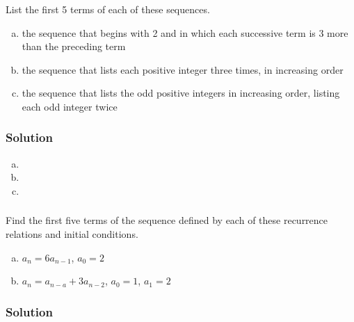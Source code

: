 \documentclass[11pt,a4paper,multicol]{article}
\newcommand{\problem}[1]{%
\setcounter{subsubsection}{#1}%
\addtocounter{subsubsection}{-1}%
\subsubsection{\hfill}%
}
\newenvironment{subproblem}
	{\begin{enumerate}[a)]}
	{\end{enumerate}}
\newcommand{\skipitem}{\addtocounter{enumi}{1}}
\newcommand{\solution}{%
\subsubsection*{Solution}%
}
\begin{document}
		\problem{5}
			List the first 5 terms of each of these sequences.
			\begin{subproblem}
				\item the sequence that begins with 2 and in which each successive term is 3 more than the preceding term
				\skipitem
				\skipitem
				\skipitem
				\item the sequence that lists each positive integer three times, in increasing order
				\item the sequence that lists the odd positive integers in increasing order, listing each odd integer twice
			\end{subproblem}
		\solution
			\begin{subproblem}
				\item
				\skipitem
				\skipitem
				\skipitem
				\item
				\item
			\end{subproblem}

		\problem{9}
			Find the first five terms of the sequence defined by each of these recurrence relations and initial conditions.
			\begin{subproblem}
				\item $a_n = 6a_{n-1}$, $a_0 = 2$
				\skipitem
				\item $a_n = a_{n-a} + 3a_{n-2}$, $a_0 = 1$, $a_1 = 2$
			\end{subproblem}
		\solution
			
\end{document}
